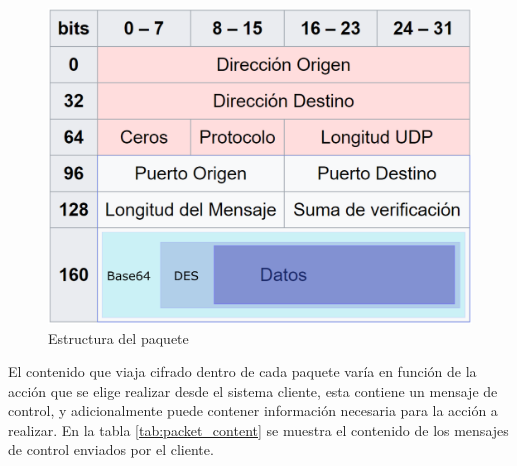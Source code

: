 \documentclass[12pt]{article}
\begin{document}
            \begin{figure}[h!]
            \centering
                \includegraphics[scale=0.4]{ip_packet.eps}
                \caption{Estructura del paquete}
                \label{fig:ip_packet}
            \end{figure}

            El contenido que viaja cifrado dentro de cada paquete varía en función de la acción que se elige realizar desde el sistema cliente, esta contiene un mensaje de control, y adicionalmente puede contener información necesaria para la acción a realizar. En la tabla \ref{tab:packet_content} se muestra el contenido de los mensajes de control enviados por el cliente.
\end{document}
